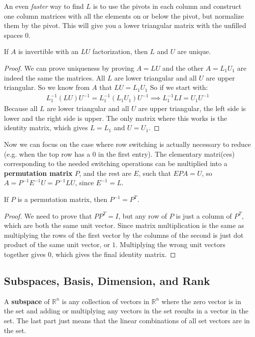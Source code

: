 \documentclass{article}
\begin{document}
An even \textit{faster} way to find $L$ is to use the pivots in each column and construct one column matrices with all the elements on or below the pivot, but normalize them by the pivot. This will give you a lower triangular matrix with the unfilled spaces $0$.

If $A$ is invertible with an $LU$ factorization, then $L$ and $U$ are unique.

\begin{proof}
We can prove uniqueness by proving $A = LU$ and the other $A = L_1U_1$ are indeed the same the matrices. All $L$ are lower triangular and all $U$ are upper triangular. So we know from $A$ that $LU = L_1U_1$ So if we start with:
\begin{gather*}
    L_1^{-1}(LU)U^{-1} = L_1^{-1}(L_1U_1)U^{-1} \implies L_1^{-1}L I = U_1U^{-1}
\end{gather*}
Because all $L$ are lower triangular and all $U$ are upper triangular, the left side is lower and the right side is upper. The only matrix where this works is the identity matrix, which gives $L = L_1$ and $U = U_1$.
\end{proof}
Now we can focus on the case where row switching is actually necessary to reduce (e.g. when the top row has a 0 in the first entry). The elementary matri(ces) corresponding to the needed switching operations can be multiplied into a \textbf{permutation matrix} $P$, and the rest are $E$, such that $EPA = U$, so $A = P^{-1}E^{-1}U = P^{-1}LU$, since $E^{-1} = L$.

If $P$ is a permutation matrix, then $P^{-1} = P^T$.
\begin{proof}
We need to prove that $PP^T = I$, but any row of $P$ is just a column of $P^T$, which are both the same unit vector. Since matrix multiplication is the same as multiplying the rows of the first vector by the columns of the second is just dot product of the same unit vector, or $1$. Multiplying the wrong unit vectors together gives $0$, which gives the final identity matrix.
\end{proof}
\subsection{Subspaces, Basis, Dimension, and Rank}
A \textbf{subspace} of $\mathbb{R}^n$ is any collection of vectors in $\mathbb{R}^n$ where the zero vector is in the set and adding or multiplying any vectors in the set results in a vector in the set. The last part just means that the linear combinations of all set vectors are in the set.
\end{document}
